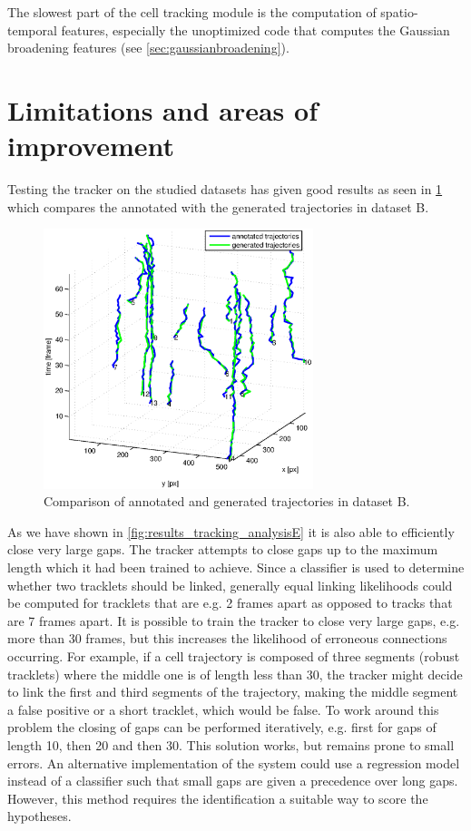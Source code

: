 	The slowest part of the cell tracking module is the computation of spatio-temporal features, especially the unoptimized code that computes the Gaussian broadening features (see \cref{sec:gaussianbroadening}).
	
\section{Limitations and areas of improvement}
	\label{sec:results_limitations}
	
	Testing the tracker on the studied datasets has given good results as seen in \cref{fig:tracking_results_datasetBlongerthan10} which compares the annotated with the generated trajectories in dataset B.
	
	\begin{figure}[h]
		\centering
		\includegraphics[width=0.7\textwidth]{images/fig_results_tracking_analysis_2}
		\caption{Comparison of annotated and generated trajectories in dataset B.}
		\label{fig:tracking_results_datasetBlongerthan10}
	\end{figure}
	
	As we have shown in \cref{fig:results_tracking_analysisE} it is also able to efficiently close very large gaps. The tracker attempts to close gaps up to the maximum length which it had been trained to achieve. Since a classifier is used to determine whether two tracklets should be linked, generally equal linking likelihoods could be computed for tracklets that are e.g. 2 frames apart as opposed to tracks that are 7 frames apart. It is possible to train the tracker to close very large gaps, e.g. more than 30 frames, but this increases the likelihood of erroneous connections occurring. For example, if a cell trajectory is composed of three segments (robust tracklets) where the middle one is of length less than 30, the tracker might decide to link the first and third segments of the trajectory, making the middle segment a false positive or a short tracklet, which would be false. To work around this problem the closing of gaps can be performed iteratively, e.g. first for gaps of length 10, then 20 and then 30. This solution works, but remains prone to small errors. An alternative implementation of the system could use a regression model instead of a classifier such that small gaps are given a precedence over long gaps. However, this method requires the identification a suitable way to score the hypotheses.
	
